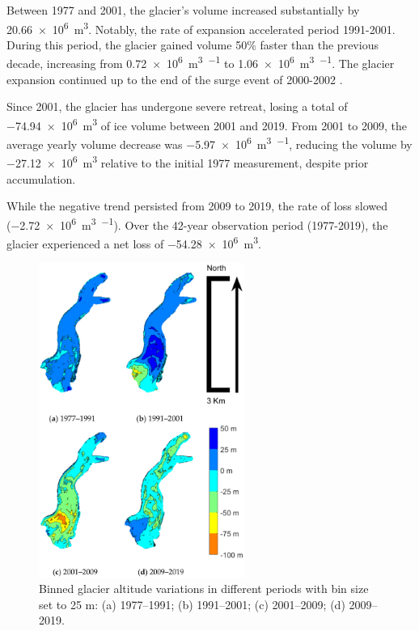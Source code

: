 {{Between 1977 and 2001, the glacier’s volume increased substantially by \SI[retain-explicit-plus]{+20.66e6}{\cubic\meter}.
Notably, the rate of expansion accelerated period 1991-2001.
During this period, the glacier gained volume 50\% faster than the previous decade, increasing from \SI[retain-explicit-plus]{+0.72e6}{\cubic\meter\per\year} to \SI[retain-explicit-plus]{+1.06e6}{\cubic\meter\per\year}.
The glacier expansion continued up to the end of the surge event of 2000-2002 \citep{Haeberli2002, Kaab2004, Mortara2009}.

Since 2001, the glacier has undergone severe retreat, losing a total of \SI{-74.94e6}{\cubic\meter} of ice volume between 2001 and 2019.
From 2001 to 2009, the average yearly volume decrease was \SI{-5.97e6}{\cubic\meter\per\year}, reducing the volume by \SI{-27.12e6}{\cubic\meter} relative to the initial 1977 measurement, despite prior accumulation.

While the negative trend persisted from 2009 to 2019, the rate of loss slowed (\SI{-2.72e6}{\cubic\meter\per\year}).
Over the 42-year observation period (1977-2019), the glacier experienced a net loss of \SI{-54.28e6}{\cubic\meter}.

\begin{figure}
    \centering
    \includegraphics[width=0.6\textwidth]{results_volumes_variations.png}
    \caption{Binned glacier altitude variations in different periods with bin size set to 25 m: (a) 1977–1991; (b) 1991–2001; (c) 2001–2009; (d) 2009–2019. }
    \label{fig:2:volume_variations}
\end{figure}

}}
